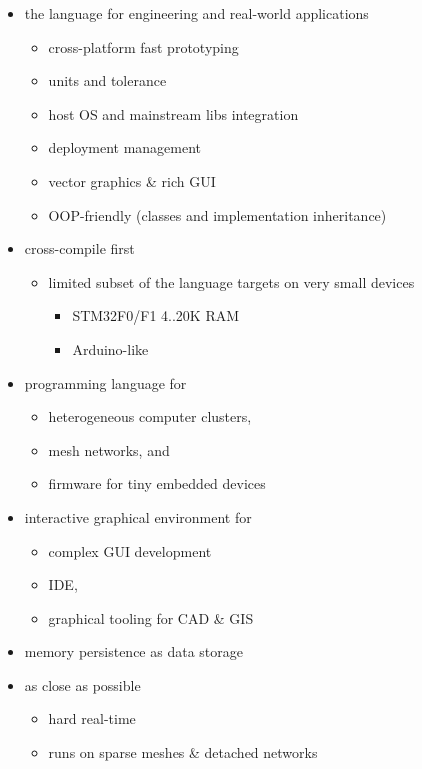 \label{princ}

\begin{itemize}[nosep]
    \item the language for engineering and real-world applications
    \begin{itemize}[nosep]
        \item cross-platform fast prototyping
        \item units and tolerance
        \item host OS and mainstream libs integration
        \item deployment management
        \item vector graphics \& rich GUI
        \item OOP-friendly (classes and implementation inheritance)
    \end{itemize}
    \item cross-compile first
    \begin{itemize}[nosep]
        \item limited subset of the language targets on very small devices
        \begin{itemize}[nosep]
            \item STM32F0/F1 4..20K RAM
            \item Arduino-like
        \end{itemize}
    \end{itemize}
    \item programming language for
    \begin{itemize}[nosep]
        \item heterogeneous computer clusters,
        \item mesh networks, and
        \item firmware for tiny embedded devices
    \end{itemize}
    \item interactive graphical environment for
    \begin{itemize}[nosep]
        \item complex GUI development
        \item IDE,
        \item graphical tooling for CAD \& GIS
    \end{itemize}
    \item memory persistence as data storage
    \item as close as possible
    \begin{itemize}[nosep]
        \item hard real-time
        \item runs on sparse meshes \& detached networks
    \end{itemize}
\end{itemize}
